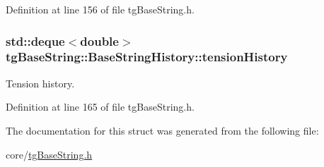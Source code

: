 Definition at line 156 of file tg\-Base\-String.\-h.

\hypertarget{structtg_base_string_1_1_base_string_history_a7488efc0119d4d2abeff29fc52606340}{
\subsubsection[{tension\-History}]{\setlength{\rightskip}{0pt plus 5cm}std\-::deque$<$double$>$ tg\-Base\-String\-::\-Base\-String\-History\-::tension\-History}}\label{structtg_base_string_1_1_base_string_history_a7488efc0119d4d2abeff29fc52606340}
Tension history. 

Definition at line 165 of file tg\-Base\-String.\-h.



The documentation for this struct was generated from the following file\-:\begin{DoxyCompactItemize}
\item 
core/\hyperlink{tg_base_string_8h}{tg\-Base\-String.\-h}\end{DoxyCompactItemize}
